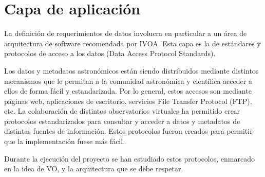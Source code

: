 \section{Capa de aplicación}


La definición de requerimientos de datos involucra en particular a un área de
arquitectura de software recomendada por IVOA. Esta capa es la de
estándares y protocolos de acceso a los datos (Data Access Protocol Standards).

Los datos y metadatos astronómicos están siendo distribuidos mediante distintos
mecanismos que le permitan a la comunidad astronómica y científica acceder a
ellos de forma fácil y estandarizada. Por lo general, estos accesos son mediante
páginas web, aplicaciones de escritorio, servicios File Transfer Protocol
(FTP), etc. La colaboración de distintos observatorios virtuales ha permitido
crear protocolos estandarizados para consultar y acceder a datos y metadatos de
distintas fuentes de información. Estos protocolos fueron creados para permitir
que la implementación fuese más fácil.

Durante la ejecución del proyecto se han estudiado estos protocolos, enmarcado
en la idea de VO, y la arquitectura que se debe respetar.

